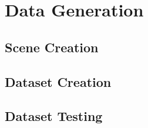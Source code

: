 \chapter{Data Generation}\label{ch:data-generation}


\section{Scene Creation}\label{sec:scene-creation}


\section{Dataset Creation}\label{sec:dataset-creation}


\section{Dataset Testing}\label{sec:dataset-testing}